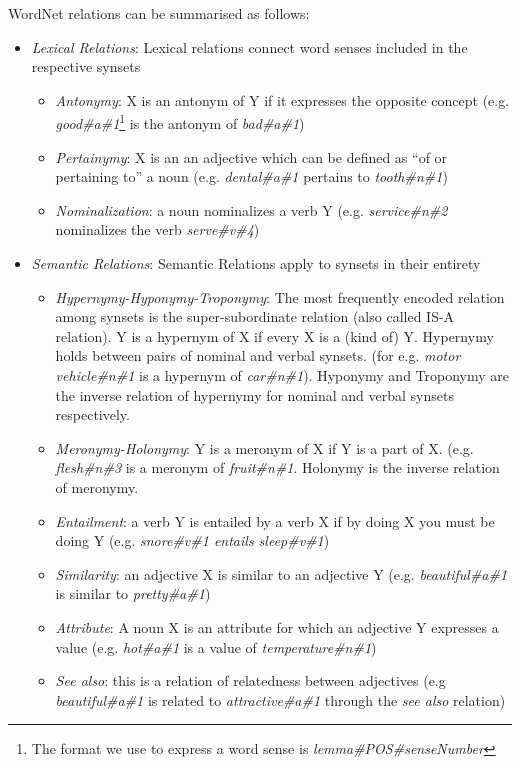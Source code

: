\noindent
WordNet relations can be summarised as follows:
\begin{itemize}
\item \textit{Lexical Relations}: Lexical relations connect word senses included in the respective synsets
  \begin{itemize}
  \item \textit{Antonymy}: X is an antonym of Y if it expresses the opposite concept (e.g. \textit{good\#a\#1}\footnote{The format we use to express a word sense is \textit{lemma\#POS\#senseNumber}} is the antonym of \textit{bad\#a\#1})
  \item \textit{Pertainymy}: X is an an adjective which can be defined as ``of or pertaining to'' a noun (e.g. \textit{dental\#a\#1} pertains to \textit{tooth\#n\#1})
  \item \textit{Nominalization}: a noun nominalizes a verb Y (e.g. \textit{service\#n\#2} nominalizes the verb \textit{serve\#v\#4})
  \end{itemize}
\item \textit{Semantic Relations}: Semantic Relations apply to synsets in their entirety
  \begin{itemize}
  \item \textit{Hypernymy-Hyponymy-Troponymy}: The most frequently encoded relation among synsets is the super-subordinate relation (also called IS-A relation).
  Y is a hypernym of X if every X is a (kind of) Y. Hypernymy holds between pairs of nominal and verbal synsets. (for e.g. \textit{motor vehicle\#n\#1} is a hypernym of \textit{car\#n\#1}).
  Hyponymy and Troponymy are the inverse relation of hypernymy for nominal and verbal synsets respectively.
  \item \textit{Meronymy-Holonymy}: Y is a meronym of X if Y is a part of X. (e.g. \textit{flesh\#n\#3} is a meronym of \textit{fruit\#n\#1}.
  Holonymy is the inverse relation of meronymy.
  \item \textit{Entailment}: a verb Y is entailed by a verb X if by doing X you must be doing Y (e.g. \textit{snore\#v\#1 entails sleep\#v\#1})
  \item \textit{Similarity}: an adjective X is similar to an adjective Y (e.g. \textit{beautiful\#a\#1} is similar to \textit{pretty\#a\#1})
  \item \textit{Attribute}: A noun X is an attribute for which an adjective Y expresses a value (e.g. \textit{hot\#a\#1} is a value of \textit{temperature\#n\#1})
  \item \textit{See also}: this is a relation of relatedness between adjectives (e.g \textit{beautiful\#a\#1} is related to \textit{attractive\#a\#1} through the \textit{see also} relation)
  \end{itemize}  
\end{itemize}

